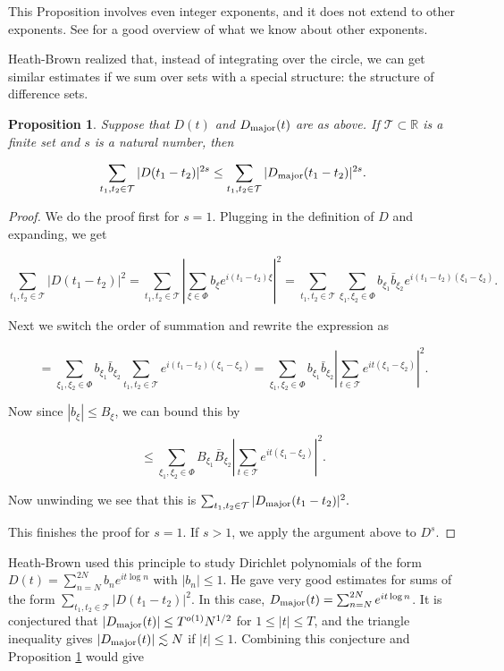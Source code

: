 \documentclass{amsart}
\newtheorem{prop}{Proposition}[section]
\newcommand{\RR}{\mathbb{R}}
\begin{document}
This Proposition involves even integer exponents,  and it does not extend to other exponents.   See \cite{GR} for a good overview of what we know about other exponents.

Heath-Brown realized that,  instead of integrating over the circle,  we can get similar estimates if we sum over sets with a special structure: the structure of difference sets. 

\begin{prop} \label{propHBHL}  Suppose that $D(t)$ and $D_{\textrm{major}}(t)$ are as above.   If $\mathcal{T} \subset \RR$ is a finite set and $s$ is a natural number, then

$$\sum_{t_1, t_2 \in \mathcal{T}} |D(t_1 - t_2)|^{2s} \le \sum_{t_1, t_2 \in \mathcal{T}} |D_{\textrm{major}}(t_1 - t_2)|^{2s} .  $$

\end{prop} 

\begin{proof}  We do the proof first for $s=1$.   Plugging in the definition of $D$ and expanding,  we get

$$\sum_{t_1, t_2 \in \mathcal{T}} |D(t_1 - t_2)|^{2} = \sum_{t_1, t_2 \in \mathcal{T}} \left| \sum_{\xi \in \Phi} b_\xi e^{i (t_1 - t_2) \xi} \right|^2 =  \sum_{t_1, t_2 \in \mathcal{T}}  \sum_{\xi_1, \xi_2 \in \Phi} b_{\xi_1} \bar b_{\xi_2}  e^{i (t_1 - t_2) (\xi_1 - \xi_2)}. $$

Next we switch the order of summation and rewrite the expression as

$$ =  \sum_{\xi_1, \xi_2 \in \Phi} b_{\xi_1} \bar b_{\xi_2}    \sum_{t_1, t_2 \in \mathcal{T}}  e^{i (t_1 - t_2) (\xi_1 - \xi_2)} =   \sum_{\xi_1, \xi_2 \in \Phi} b_{\xi_1} \bar b_{\xi_2}  \left| \sum_{t \in \mathcal{T}} e^{i t (\xi_1 - \xi_2)} \right|^2.$$

Now since $|b_{\xi}| \le B_\xi$,  we can bound this by

$$ \le   \sum_{\xi_1, \xi_2 \in \Phi} B_{\xi_1} \bar B_{\xi_2}  \left| \sum_{t \in \mathcal{T}} e^{i t (\xi_1 - \xi_2)} \right|^2.$$

Now unwinding we see that this is $ \sum_{t_1, t_2 \in \mathcal{T}} |D_{\textrm{major}}(t_1 - t_2)|^{2}. $

This finishes the proof for $s=1$.   If $s > 1$, we apply the argument above to $D^s$.

\end{proof}

Heath-Brown used this principle to study Dirichlet polynomials of the form $D(t) = \sum_{n=N}^{2N} b_n e^{i t \log n}$ with $|b_n| \le 1$.   
He gave very good estimates for sums of the form $ \sum_{t_1, t_2 \in \mathcal{T}} |D(t_1 - t_2)|^2$.   In this case,  $D_{\textrm{major}}(t) = \sum_{n=N}^{2N} e^{i t \log n}$.   It is conjectured that $|D_{\textrm{major}}(t)| \le T^{o(1)} N^{1/2}$ for $1 \le |t| \le T$,  and the triangle inequality gives $|D_{\textrm{major}}(t)| \lesssim N$ if $|t| \le 1$.   Combining this conjecture and Proposition \ref{propHBHL} would give
\end{document}
